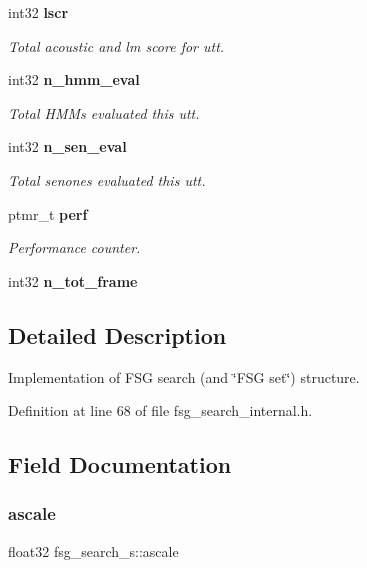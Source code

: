 \begin{DoxyCompactItemize}
\item 
\mbox{\label{structfsg__search__s_a709277a80e9418ecc3e63296f8eb6bbf}} 
int32 \textbf{ lscr}
\begin{DoxyCompactList}\small\item\em Total acoustic and lm score for utt. \end{DoxyCompactList}\item 
\mbox{\label{structfsg__search__s_a7e3d7375b4a33af339e8b55885677faa}} 
int32 \textbf{ n\+\_\+hmm\+\_\+eval}
\begin{DoxyCompactList}\small\item\em Total H\+M\+Ms evaluated this utt. \end{DoxyCompactList}\item 
\mbox{\label{structfsg__search__s_a56494e3b30d0c66367c7ef055b8addb2}} 
int32 \textbf{ n\+\_\+sen\+\_\+eval}
\begin{DoxyCompactList}\small\item\em Total senones evaluated this utt. \end{DoxyCompactList}\item 
\mbox{\label{structfsg__search__s_add677e47865b37fb38068a78abc7b2c4}} 
ptmr\+\_\+t \textbf{ perf}
\begin{DoxyCompactList}\small\item\em Performance counter. \end{DoxyCompactList}\item 
\mbox{\label{structfsg__search__s_aaaabef8be74b09945e28864c6040f0ff}} 
int32 {\bfseries n\+\_\+tot\+\_\+frame}
\end{DoxyCompactItemize}


\subsection{Detailed Description}
Implementation of F\+SG search (and \char`\"{}\+F\+S\+G set\char`\"{}) structure. 

Definition at line 68 of file fsg\+\_\+search\+\_\+internal.\+h.



\subsection{Field Documentation}
\mbox{\label{structfsg__search__s_a4d13fff2e14882b0125386fc27a4097f}} 
\subsubsection{ascale}
{\footnotesize\ttfamily float32 fsg\+\_\+search\+\_\+s\+::ascale}



